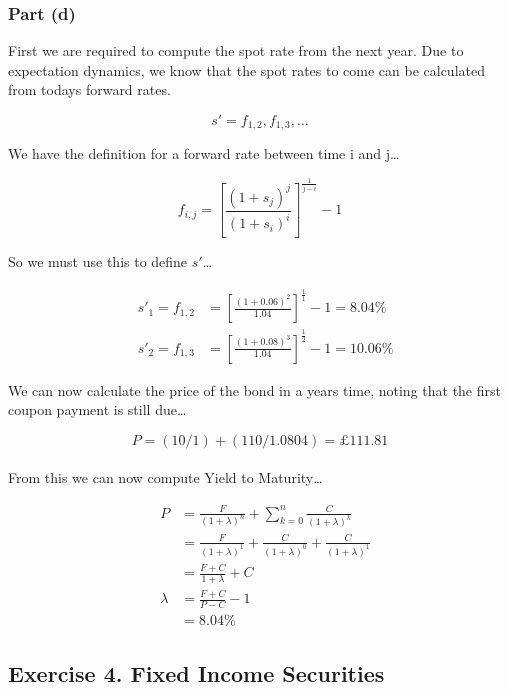\documentclass[11pt]{article}
\begin{document}
\subsubsection*{Part (d)}

First we are required to compute the spot rate from the next year. Due to expectation dynamics,
we know that the spot rates to come can be calculated from todays forward rates.

\[ s' = f_{1,2}, f_{1,3}, \dots \]

We have the definition for a forward rate between time i and j\dots

\[ f_{i,j} = \left[ \frac{\left(1 + s_{j}\right)^{j}}{\left(1 + s_{i}\right)^{i}} \right]^{\frac{1}{j - i}} - 1 \]

So we must use this to define $s'$\dots

\begin{eqnarray}
  & s'_{1} = f_{1,2} &= \left[ \frac{\left(1 + 0.06\right)^{2}}{1.04} \right]^{\frac{1}{1}} - 1 = 8.04\% \\
  & s'_{2} = f_{1,3} &= \left[ \frac{\left(1 + 0.08\right)^{3}}{1.04} \right]^{\frac{1}{2}} - 1 = 10.06\%
\end{eqnarray}

We can now calculate the price of the bond in a years time, noting that the first coupon payment is still due\dots

\[ P = \left(10 / 1\right) + \left(110 / 1.0804\right) = £111.81 \]
\\
From this we can now compute Yield to Maturity\dots

\begin{eqnarray}
  & P &= \frac{F}{\left(1 + \lambda\right)^{n}} + \sum_{k=0}^{n} \frac{C}{\left(1 + \lambda\right)^{k}} \\[4mm]
  &&= \frac{F}{\left(1 + \lambda\right)^{1}} + \frac{C}{\left(1 + \lambda\right)^{0}} + \frac{C}{\left(1 + \lambda\right)^{1}} \\[4mm]
  &&= \frac{F + C}{1 + \lambda} + C \\[4mm]
  & \lambda &= \frac{F + C}{P - C} - 1 \\[4mm]
  &&= 8.04\%
\end{eqnarray}

\newpage


\subsection*{Exercise 4. Fixed Income Securities}
\end{document}
